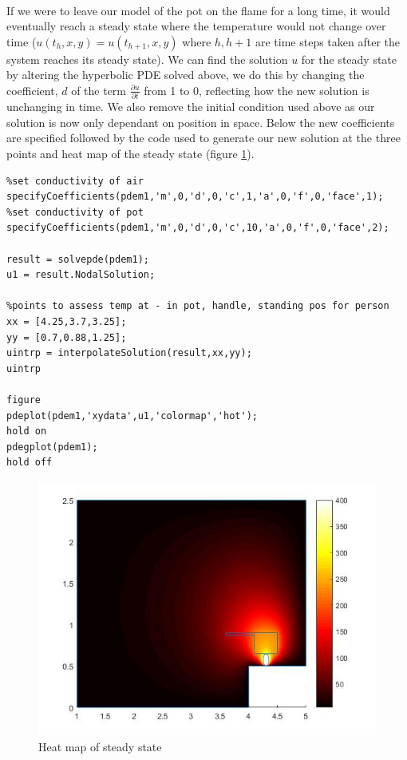 \documentclass[12pt]{article}  %
\begin{document}
\paragraph{} If we were to leave our model of the pot on the flame for a long time, it would eventually reach a steady state where the temperature would not change over time ($u(t_h,x,y)=u(t_{h+1},x,y)$ where $h,h+1$ are time steps taken after the system reaches its steady state). 
We can find the solution $u$ for the steady state by altering the hyperbolic PDE solved above, we do this by changing the coefficient, $d$ of the term $\frac{\partial u}{\partial t}$ from 1 to 0, reflecting how the new solution is unchanging in time. We also remove the initial condition used above as our solution is now only dependant on position in space.
Below the new coefficients are specified followed by the code used to generate our new solution at the three points and heat map of the steady state (figure \ref{heatmap2}). 

\begin{lstlisting}
%set conductivity of air
specifyCoefficients(pdem1,'m',0,'d',0,'c',1,'a',0,'f',0,'face',1);
%set conductivity of pot 
specifyCoefficients(pdem1,'m',0,'d',0,'c',10,'a',0,'f',0,'face',2);

result = solvepde(pdem1);
u1 = result.NodalSolution;

%points to assess temp at - in pot, handle, standing pos for person
xx = [4.25,3.7,3.25];
yy = [0.7,0.88,1.25];
uintrp = interpolateSolution(result,xx,yy);
uintrp

figure 
pdeplot(pdem1,'xydata',u1,'colormap','hot'); 
hold on 
pdegplot(pdem1);
hold off 

\end{lstlisting}

\begin{figure}[H]
	\includegraphics[scale=.75]{heatmap2}
	\caption{Heat map of steady state}
	\label{heatmap2}
\end{figure}
\end{document}
